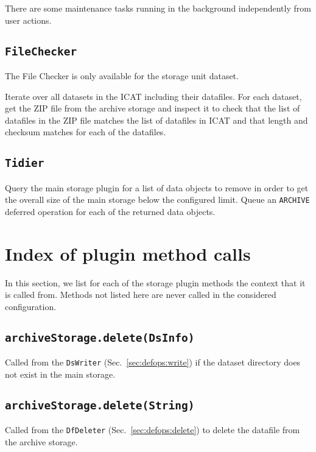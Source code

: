 \documentclass[paper=a4]{scrartcl}
\begin{document}
There are some maintenance tasks running in the background
independently from user actions.

\subsection{\texttt{FileChecker}}
\label{sec:maintenance:filechecker}

The File Checker is only available for the storage unit dataset.

Iterate over all datasets in the ICAT including their datafiles. For
each dataset, get the ZIP file from the archive storage and inspect it
to check that the list of datafiles in the ZIP file matches the list
of datafiles in ICAT and that length and checksum matches for each of
the datafiles.

\subsection{\texttt{Tidier}}
\label{sec:maintenance:tidier}

Query the main storage plugin for a list of data objects to remove in
order to get the overall size of the main storage below the configured
limit. Queue an \texttt{ARCHIVE} deferred operation for each of the
returned data objects.


\section{Index of plugin method calls}
\label{sec:plugincalls}

In this section, we list for each of the storage plugin methods the
context that it is called from. Methods not listed here are never
called in the considered configuration.

\subsection{\texttt{archiveStorage.delete(DsInfo)}}

Called from the \texttt{DsWriter} (Sec.\ \ref{sec:defops:write}) if
the dataset directory does not exist in the main storage.

\subsection{\texttt{archiveStorage.delete(String)}}

Called from the \texttt{DfDeleter} (Sec.\ \ref{sec:defops:delete}) to
delete the datafile from the archive storage.
\end{document}
